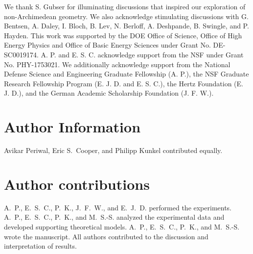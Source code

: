 We thank S. Gubser for illuminating discussions that inspired our exploration of non-Archimedean geometry.  We also acknowledge stimulating discussions with G. Bentsen, A. Daley, I. Bloch, B. Lev, N. Berloff, A. Deshpande, B. Swingle, and P. Hayden.  This work was supported by the DOE Office of Science, Office of High Energy Physics and Office of Basic Energy Sciences under Grant No. DE-SC0019174.  A. P. and E. S. C. acknowledge support from the NSF under Grant No. PHY-1753021. We additionally acknowledge support from the National Defense Science and Engineering Graduate Fellowship (A. P.), the NSF Graduate Research Fellowship Program (E. J. D. and E. S. C.), the Hertz Foundation (E. J. D.), and the German Academic Scholarship Foundation (J. F. W.).

\section*{Author Information}
Avikar Periwal, Eric S.~Cooper, and Philipp Kunkel contributed equally.

\section*{Author contributions}
A.~P., E.~S.~C., P.~K., J.~F.~W., and E.~J.~D. performed the experiments.  A.~P., E.~S.~C., P.~K., and M.~S.-S. analyzed the experimental data and developed supporting theoretical models.  A.~P., E.~S.~C., P.~K., and M.~S.-S. wrote the manuscript. All authors contributed to the discussion and interpretation of results.